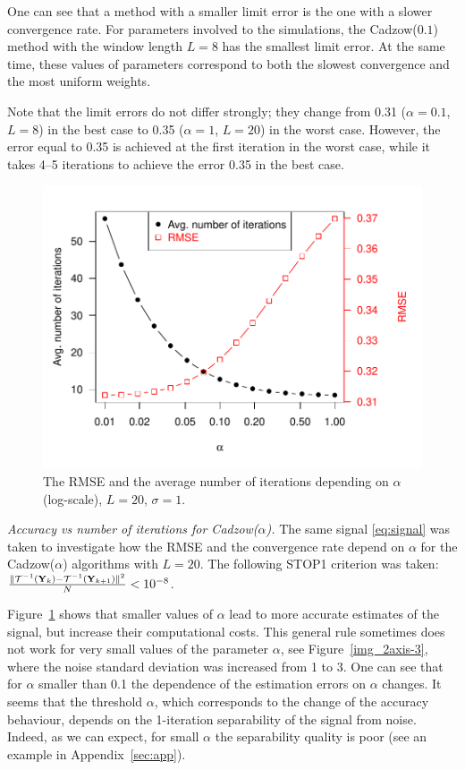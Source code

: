 \documentclass[sii]{ipart}
\begin{document}
One can see that a method with a smaller limit error is the one with a slower convergence rate. For parameters involved to the simulations, the Cadzow($0.1$) method with the window length $L=8$ has the smallest limit error. At the same time, these values of parameters correspond to both the slowest convergence and the most uniform weights.

Note that the limit errors do not differ strongly; they change from 0.31 ($\alpha=0.1$, $L=8$) in the best case to 0.35 ($\alpha=1$, $L=20$) in the worst case. However, the error equal to 0.35 is achieved at the first iteration in the worst case, while it takes 4--5 iterations to achieve the error 0.35 in the best case.

\begin{figure}[!hhh]
	\includegraphics[width = \columnwidth]{2axis.pdf}
	\caption{The RMSE and the average number of iterations depending on $\alpha$ (log-scale), $L=20$, $\sigma=1$.}
	\label{img_2axis}
\end{figure}

\smallskip
\textit{Accuracy vs number of iterations for Cadzow($\alpha$).}
The same signal \eqref{eq:signal} was taken to investigate how the RMSE and the convergence rate depend on $\alpha$ for the Cadzow($\alpha$) algorithms with $L = 20$. The following STOP1 criterion was taken: $\frac{\|\mathcal{T}^{-1}(\mathbf{Y}_k) - \mathcal{T}^{-1}(\mathbf{Y}_{k + 1})\|^2}{N} < 10^{-8}$.

Figure~\ref{img_2axis} shows that smaller values of $\alpha$ lead to more accurate estimates of the signal, but increase their computational costs.
This general rule sometimes does not work for very small values of the parameter $\alpha$, see Figure~\ref{img_2axis-3}, where
the noise standard deviation was increased from 1 to 3. One can see that for $\alpha$ smaller than 0.1 the dependence of the estimation errors on $\alpha$ changes.
It seems that the threshold $\alpha$, which corresponds to the change of the accuracy behaviour, depends on the 1-iteration separability of the signal from noise.
Indeed, as we can expect, for small $\alpha$ the separability quality is poor (see an example in Appendix~\ref{sec:app}).
\end{document}
